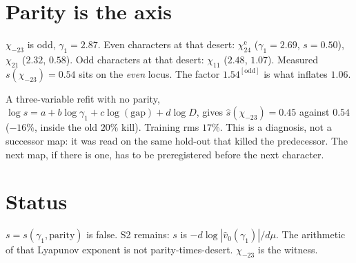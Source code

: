\documentclass[10pt]{article}
\begin{document}
\section{Parity is the axis}

$\chi_{-23}$ is odd, $\gamma_1=2.87$. Even characters at that desert:
$\chi_{24}^{\mathrm{e}}$ ($\gamma_1=2.69$, $s=0.50$), $\chi_{21}$
($2.32$, $0.58$). Odd characters at that desert: $\chi_{11}$
($2.48$, $1.07$). Measured $s(\chi_{-23})=0.54$ sits on the
\emph{even} locus. The factor $1.54^{[\mathrm{odd}]}$ is what
inflates $1.06$.

A three-variable refit with no parity,
$\log s = a + b\log\gamma_1 + c\log(\mathrm{gap}) + d\log D$,
gives $\hat s(\chi_{-23})=0.45$ against $0.54$ ($-16\%$, inside the
old $20\%$ kill). Training rms $17\%$. This is a diagnosis, not a
successor map: it was read on the same hold-out that killed the
predecessor. The next map, if there is one, has to be
preregistered before the next character.

\section{Status}

$s=s(\gamma_1,\mathrm{parity})$ is false. S2 remains: $s$ is
$-d\log|\hat v_0(\gamma_1)|/d\mu$. The arithmetic of that Lyapunov
exponent is not parity-times-desert. $\chi_{-23}$ is the witness.
\end{document}
